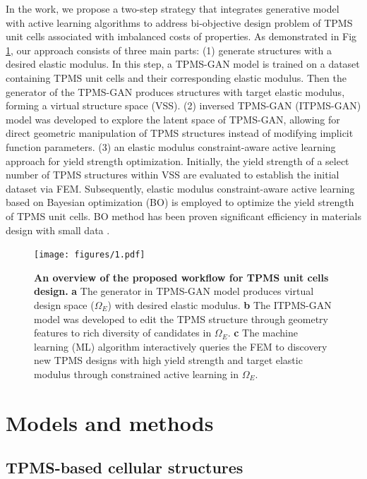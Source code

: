 \documentclass[preprint,review,12pt,authoryear]{elsarticle}
\begin{document}
In the work, we propose a two-step strategy that integrates generative model with active learning algorithms to address bi-objective design problem of TPMS unit cells associated with imbalanced costs of properties. As demonstrated in Fig \ref{fig:1}, our approach consists of three main parts: (1) generate structures with a desired elastic modulus. In this step, a TPMS-GAN model is trained on a dataset containing TPMS unit cells and their corresponding elastic modulus. Then the generator of the TPMS-GAN produces structures with target elastic modulus, forming a virtual structure space (VSS). (2) inversed TPMS-GAN (ITPMS-GAN) model was developed to explore the latent space of TPMS-GAN, allowing for direct geometric manipulation of TPMS structures instead of modifying implicit function parameters. (3) an elastic modulus constraint-aware active learning approach for yield strength optimization. Initially, the yield strength of a select number of TPMS structures within VSS are evaluated to establish the initial dataset via FEM. Subsequently, elastic modulus constraint-aware active learning based on Bayesian optimization (BO) is employed to optimize the yield strength of TPMS unit cells. BO method has been proven significant efficiency in materials design with small data \citep{Ma2024b,Cao2024a,Tian2024a}.

\begin{figure}
    \centering
    \texttt{[image: figures/1.pdf]}
    \caption{\textbf{An overview of the proposed workflow for TPMS unit cells design.} \textbf{a} The generator in TPMS-GAN model produces virtual design space ($\Omega_E$) with desired elastic modulus. \textbf{b} The ITPMS-GAN model was developed to edit the TPMS structure through geometry features to rich diversity of candidates in $\Omega_E$. \textbf{c} The machine learning (ML) algorithm interactively queries the FEM to discovery new TPMS designs with high yield strength and target elastic modulus through constrained active learning in $\Omega_E$.}
    \label{fig:1}
\end{figure}

\section{Models and methods}

\subsection{TPMS-based cellular structures}
\end{document}
